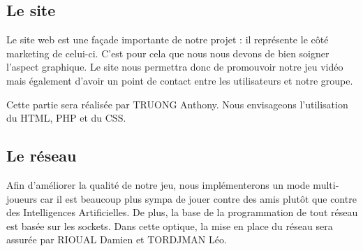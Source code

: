 \documentclass[A4paper,11pt]{article}
\begin{document}
\subsection{Le site}
Le site web est une fa\c{c}ade importante de notre projet : il repr\'esente le c\^ot\'e marketing de celui-ci. C'est pour cela que nous nous devons de bien soigner l'aspect graphique. Le site nous permettra donc de promouvoir notre jeu vid\'eo mais \'egalement d'avoir un point de contact entre les utilisateurs et notre groupe.

Cette partie sera r\'ealis\'ee par TRUONG Anthony. Nous envisageons l'utilisation du HTML, PHP et du CSS.
\subsection{Le r\'eseau}
Afin d'am\'eliorer la qualit\'e de notre jeu, nous impl\'ementerons un mode multi-joueurs car il est beaucoup plus sympa de jouer contre des amis plut\^ot que contre des Intelligences Artificielles. De plus, la base de la programmation de tout r\'eseau est bas\'ee sur les sockets.
Dans cette optique, la mise en place du r\'eseau sera assur\'ee par RIOUAL Damien et TORDJMAN L\'eo.
\end{document}
